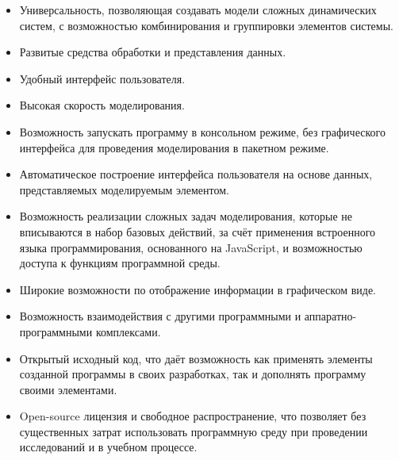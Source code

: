 \begin{itemize}

  \item
    Универсальность, позволяющая создавать модели сложных динамических систем,
    с возможностью комбинирования и группировки элементов системы.

  \item
    Развитые средства обработки и представления данных.

  \item
    Удобный интерфейс пользователя.

  \item
    Высокая скорость моделирования.

  \item
    Возможность запускать программу в консольном режиме, без графического интерфейса
    для проведения моделирования в пакетном режиме.

  \item
    Автоматическое построение интерфейса пользователя на основе
    данных, представляемых моделируемым элементом.

  \item
    Возможность реализации сложных задач моделирования, которые не вписываются
    в набор базовых действий, за счёт применения встроенного языка программирования,
    основанного на JavaScript, и возможностью доступа к функциям программной среды.

  \item
    Широкие возможности по отображение информации в графическом виде.

  \item
    Возможность взаимодействия с другими программными и аппаратно-программными
    комплексами.


  \item
    Открытый исходный код, что даёт возможность как применять элементы созданной
    программы в своих разработках, так и дополнять программу своими элементами.


  \item
    Open-source лицензия и свободное распространение,
    что позволяет без существенных затрат использовать программную среду
    при проведении исследований и в учебном процессе.

\end{itemize}




